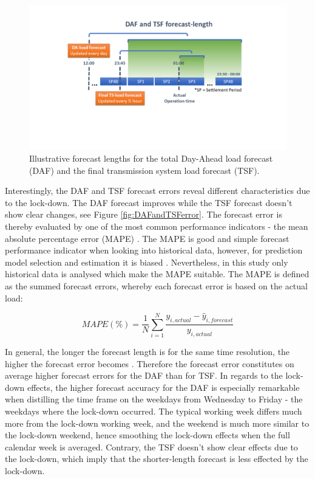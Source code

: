\documentclass[energies,article,submit,moreauthors,pdftex]{Definitions/mdpi}
\begin{document}
\begin{figure}[H]
\centering
\hspace{-25pt}
\includegraphics[trim={2cm 5cm 2 2cm},clip,width=1.1\textwidth]{Graphics/Forecast explanation.png}
\caption{Illustrative forecast lengths for the total Day-Ahead load forecast (DAF) and the final transmission system load forecast (TSF).}
\label{fig:forecast_length_explanation}
\end{figure} 

Interestingly, the DAF and TSF forecast errors reveal different characteristics due to the lock-down. The DAF forecast improves while the TSF forecast doesn't show clear changes, see Figure \ref{fig:DAFandTSFerror}. The forecast error is thereby evaluated by one of the most common performance indicators - the mean absolute percentage error (MAPE) \cite{SahayDayNetwork, He2020Day-aheadForest}. The MAPE is good and simple forecast performance indicator when looking into historical data, however, for prediction model selection and estimation it is biased \cite{Tofallis2015AEstimation}. Nevertheless, in this study only historical data is analysed which make the MAPE suitable. The MAPE is defined as the summed forecast errors, whereby each forecast error is based on the actual load:

\[ MAPE(\%) = \frac{1}{N} \sum_{i=1}^N \frac{y_{i,actual} - \hat{y}_{i,forecast}}{y_{i,actual}} \]

In general, the longer the forecast length is for the same time resolution, the higher the forecast error becomes \cite{NationalgridESO2018QuarterlyMarch18}. Therefore the forecast error constitutes on average higher forecast errors for the DAF than for TSF. In regards to the lock-down effects, the higher forecast accuracy for the DAF is especially remarkable when distilling the time frame on the weekdays from Wednesday to Friday - the weekdays where the lock-down occurred. The typical working week differs much more from the lock-down working week, and the weekend is much more similar to the lock-down weekend, hence smoothing the lock-down effects when the full calendar week is averaged. Contrary, the TSF doesn't show clear effects due to the lock-down, which imply that the shorter-length forecast is less effected by the lock-down.
\end{document}
